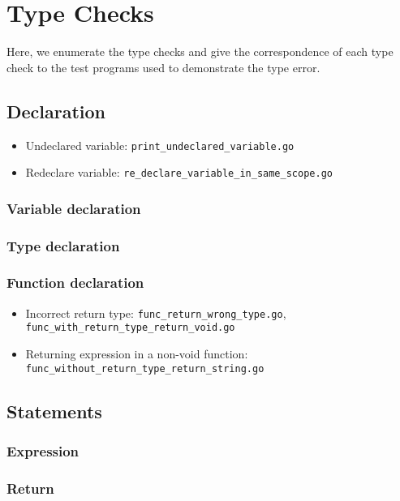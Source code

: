 \documentclass{article}
\begin{document}
\section*{Type Checks}

Here, we enumerate the type checks and give the correspondence of each type check to the test programs used to demonstrate the type error.

\subsection*{Declaration}

\begin{itemize}
\item Undeclared variable: \texttt{print_undeclared_variable.go}
\item Redeclare variable: \texttt{re_declare_variable_in_same_scope.go}
\end{itemize}

\subsubsection*{Variable declaration}
\subsubsection*{Type declaration}

\subsubsection*{Function declaration}

\begin{itemize}
\item Incorrect return type: \texttt{func_return_wrong_type.go}, \texttt{func_with_return_type_return_void.go}
\item Returning expression in a non-void function: \texttt{func_without_return_type_return_string.go}
\end{itemize}

\subsection*{Statements}

\subsubsection*{Expression}
\subsubsection*{Return}
\end{document}
